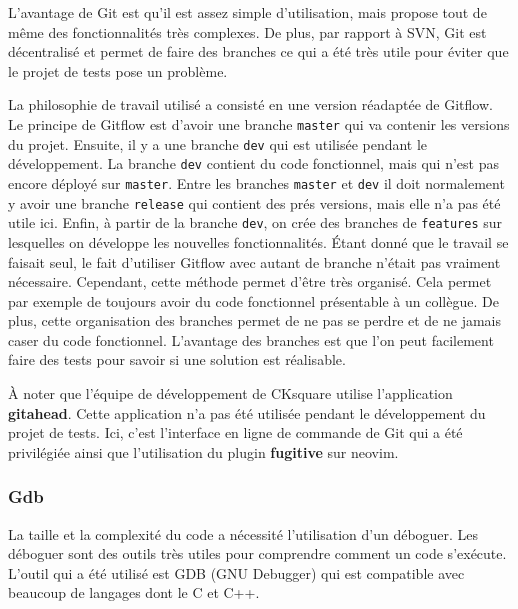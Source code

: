 \documentclass[a4paper]{article}
\begin{document}
L'avantage de Git est qu'il est assez simple d'utilisation, mais propose tout de
même des fonctionnalités très complexes. De plus, par rapport à SVN, Git est
décentralisé et permet de faire des branches ce qui a été très utile pour éviter
que le projet de tests pose un problème.

La philosophie de travail utilisé a consisté en une version réadaptée de Gitflow.
Le principe de Gitflow est d'avoir une branche \verb|master| qui va
contenir les versions du projet. Ensuite, il y a une branche \verb|dev| qui
est utilisée pendant le développement. La branche \verb|dev| contient du
code fonctionnel, mais qui n'est pas encore déployé sur \verb|master|. Entre
les branches \verb|master| et \verb|dev| il doit normalement y avoir
une branche \verb|release| qui contient des prés versions, mais elle n'a pas
été utile ici. Enfin, à partir de la branche \verb|dev|, on crée des
branches de \verb|features| sur lesquelles on développe les nouvelles
fonctionnalités. Étant donné que le travail se faisait seul, le fait d'utiliser
Gitflow avec autant de branche n'était pas vraiment nécessaire. Cependant, cette
méthode permet d'être très organisé. Cela permet par exemple de toujours avoir
du code fonctionnel présentable à un collègue. De plus, cette organisation des
branches permet de ne pas se perdre et de ne jamais caser du code fonctionnel.
L'avantage des branches est que l'on peut facilement faire des tests pour savoir
si une solution est réalisable.

À noter que l'équipe de développement de CKsquare utilise l'application
\textbf{gitahead}. Cette application n'a pas été utilisée pendant le
développement du projet de tests. Ici, c'est l'interface en ligne de commande de Git
qui a été privilégiée ainsi que l'utilisation du plugin \textbf{fugitive} sur
neovim.
\subsubsection{Gdb}%

La taille et la complexité du code a nécessité l'utilisation d'un déboguer. Les
déboguer sont des outils très utiles pour comprendre comment un code
s'exécute. L'outil qui a été utilisé est GDB (GNU Debugger) qui est compatible
avec beaucoup de langages dont le C et C++.
\end{document}
